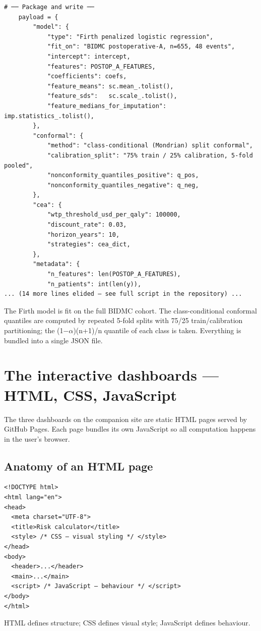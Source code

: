 \documentclass[11pt,a4paper]{article}
\begin{document}
\begin{lstlisting}[style=codeblock]
    # ── Package and write ──
    payload = {
        "model": {
            "type": "Firth penalized logistic regression",
            "fit_on": "BIDMC postoperative-A, n=655, 48 events",
            "intercept": intercept,
            "features": POSTOP_A_FEATURES,
            "coefficients": coefs,
            "feature_means": sc.mean_.tolist(),
            "feature_sds":   sc.scale_.tolist(),
            "feature_medians_for_imputation": imp.statistics_.tolist(),
        },
        "conformal": {
            "method": "class-conditional (Mondrian) split conformal",
            "calibration_split": "75% train / 25% calibration, 5-fold pooled",
            "nonconformity_quantiles_positive": q_pos,
            "nonconformity_quantiles_negative": q_neg,
        },
        "cea": {
            "wtp_threshold_usd_per_qaly": 100000,
            "discount_rate": 0.03,
            "horizon_years": 10,
            "strategies": cea_dict,
        },
        "metadata": {
            "n_features": len(POSTOP_A_FEATURES),
            "n_patients": int(len(y)),
... (14 more lines elided — see full script in the repository) ...
\end{lstlisting}

The Firth model is fit on the full BIDMC cohort. The class-conditional conformal quantiles are computed by repeated 5-fold splits with 75/25 train/calibration partitioning; the (1−$\alpha$)(n+1)/n quantile of each class is taken. Everything is bundled into a single JSON file.
\clearpage
\section{The interactive dashboards — HTML, CSS, JavaScript}
The three dashboards on the companion site are static HTML pages served by GitHub Pages. Each page bundles its own JavaScript so all computation happens in the user's browser.
\subsection{Anatomy of an HTML page}

\begin{lstlisting}[style=htmlblock]
<!DOCTYPE html>
<html lang="en">
<head>
  <meta charset="UTF-8">
  <title>Risk calculator</title>
  <style> /* CSS — visual styling */ </style>
</head>
<body>
  <header>...</header>
  <main>...</main>
  <script> /* JavaScript — behaviour */ </script>
</body>
</html>
\end{lstlisting}

HTML defines structure; CSS defines visual style; JavaScript defines behaviour.
\end{document}
